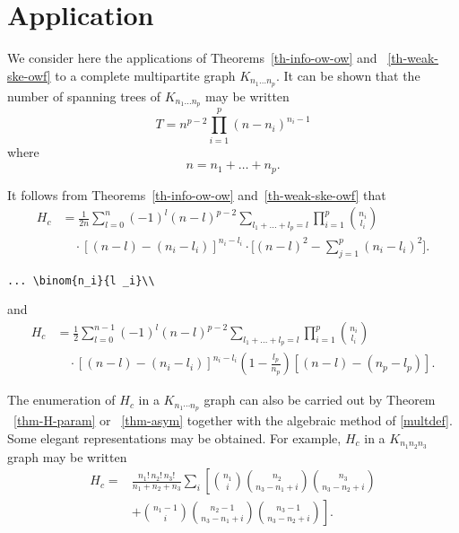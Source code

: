 \documentclass{article}
\theoremstyle{definition}
\theoremstyle{remark}
\begin{document}
\section{Application}
\label{lincomp}

We consider here the applications of Theorems~\ref{th-info-ow-ow} and
~\ref{th-weak-ske-owf} to a complete
multipartite graph $K_{n_1\dots n_p}$. It can be shown that the
number of spanning trees of $K_{n_1\dots n_p}$
may be written
\begin{equation}\label{e:st}
T=n^{p-2}\prod^p_{i=1}
(n-n_i)^{n_i-1}
\end{equation}
where
\begin{equation}
n=n_1+\dots+n_p.
\end{equation}

It follows from Theorems~\ref{th-info-ow-ow} 
and~\ref{th-weak-ske-owf} that
\begin{equation}\label{e:barwq}
\begin{split}
H_c&=\frac1{2n}
\sum^n_{{l}=0}(-1)^{l}(n-{l})^{p-2}
\sum_{l _1+\dots+l _p=l}\prod^p_{i=1}
\binom{n_i}{l _i}\\
&\quad\cdot[(n-l )-(n_i-l _i)]^{n_i-l _i}\cdot
\biggl[(n-l )^2-\sum^p_{j=1}(n_i-l _i)^2\biggr].\end{split}
\end{equation}
\begin{verbatim}
... \binom{n_i}{l _i}\\
\end{verbatim}
and
\begin{equation}\label{joe}
\begin{split}
H_c&=\frac12\sum^{n-1}_{l =0}
(-1)^{l}(n-l )^{p-2}
\sum_{l _1+\dots+l _p=l}
\prod^p_{i=1}\binom{n_i}{l _i}\\
&\quad\cdot[(n-l )-(n_i-l _i)]^{n_i-l _i}
\left(1-\frac{l _p}{n_p}\right)
[(n-l )-(n_p-l _p)].
\end{split}
\end{equation}

The enumeration of $H_c$ in a $K_{n_1\dotsm n_p}$ graph can also be
carried out by Theorem ~\ref{thm-H-param} or ~\ref{thm-asym}
together with the algebraic method of \eqref{multdef}.
Some elegant representations may be obtained. For example, $H_c$ in
a $K_{n_1n_2n_3}$ graph may be written
\begin{equation}\label{j:mark}
\begin{split}
H_c=&
\frac{n_1!\,n_2!\,n_3!}
{n_1+n_2+n_3}\sum_i\left[\binom{n_1}{i}
\binom{n_2}{n_3-n_1+i}\binom{n_3}{n_3-n_2+i}\right.\\
&+\left.\binom{n_1-1}{i}
\binom{n_2-1}{n_3-n_1+i}
\binom{n_3-1}{n_3-n_2+i}\right].\end{split}
\end{equation}
\end{document}
